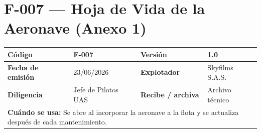 \newcommand{\cab}[5]{%
  \clearpage
  \section{#1 --- #2}\label{fmt:#1}
  \renewcommand{\arraystretch}{1.4}
  \par\noindent\begin{tabularx}{\textwidth}{|l|X|l|X|}
    \hline
    \rowcolor[gray]{0.9}\textbf{Código} & #1 & \textbf{Versión} & 1.0 \\ \hline
    \textbf{Fecha de emisión} & 23/06/2026 & \textbf{Explotador} & Skyfilms S.A.S. \\ \hline
    \textbf{Diligencia} & #3 & \textbf{Recibe / archiva} & #4 \\ \hline
    \multicolumn{4}{|p{\dimexpr\textwidth-2\tabcolsep-2\arrayrulewidth}|}{\textbf{Cuándo se usa:} #5} \\ \hline
  \end{tabularx}
  \vspace{0.4cm}
}
\newcommand{\campos}[1]{%
  \par\noindent\begin{tabularx}{\textwidth}{|X|X|}\hline #1 \end{tabularx}\vspace{0.3cm}
}
\newcommand{\caja}[2]{%
  \par\noindent\begin{tabularx}{\textwidth}{|X|}\hline \textbf{#1} \\ \hline \rule{0pt}{#2} \\ \hline \end{tabularx}\vspace{0.3cm}
}
\newcommand{\firmas}{%
  \par\noindent\begin{tabularx}{\textwidth}{|X|X|}\hline
  \textbf{Nombre:} & \textbf{Firma:} \\[0.6cm] \hline \end{tabularx}
}
\newcommand{\chk}{$\square$ CHK\ \ $\square$ NO CHK\ \ $\square$ NA}
\newcommand{\lcitem}[2]{#1 & #2 & \chk \\ \hline}
\newcommand{\lchead}[1]{\multicolumn{3}{|l|}{\cellcolor[gray]{0.85}\textbf{#1}} \\ \hline}
\newcommand{\fx}[1]{#1#1#1#1#1}


\cab{F-007}{Hoja de Vida de la Aeronave (Anexo 1)}{Jefe de Pilotos UAS}{Archivo técnico}{Se abre al incorporar la aeronave a la flota y se actualiza después de cada mantenimiento.}

